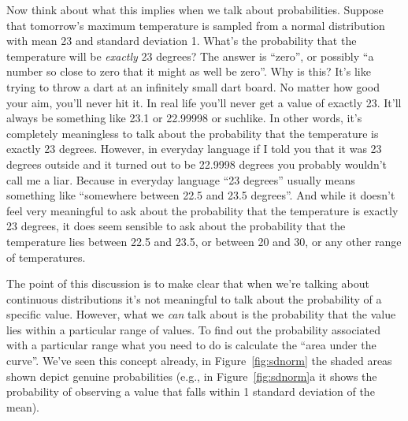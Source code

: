Now think about what this implies when we talk about probabilities. Suppose that tomorrow's maximum temperature is sampled from a normal distribution with mean 23 and standard deviation 1. What's the probability that the temperature will be {\it exactly} 23 degrees? The answer is ``zero'', or possibly ``a number so close to zero that it might as well be zero''. Why is this? It's like trying to throw a dart at an infinitely small dart board. No matter how good your aim, you'll never hit it. In real life you'll never get a value of exactly 23. It'll always be something like 23.1 or 22.99998 or suchlike. In other words, it's completely meaningless to talk about the probability that the temperature is exactly 23 degrees. However, in everyday language if I told you that it was 23 degrees outside and it turned out to be 22.9998 degrees you probably wouldn't call me a liar. Because in everyday language ``23 degrees'' usually means something like ``somewhere between 22.5 and 23.5 degrees''. And while it doesn't feel very meaningful to ask about the probability that the temperature is exactly 23 degrees, it does seem sensible to ask about the probability that the temperature lies between 22.5 and 23.5, or between 20 and 30, or any other range of temperatures. 

The point of this discussion is to make clear that when we're talking about continuous distributions it's not meaningful to talk about the probability of a specific value. However, what we {\it can} talk about is the probability that the value lies within a particular range of values. To find out the probability associated with a particular range what you need to do is calculate the ``area under the curve''. We've seen this concept already, in Figure~\ref{fig:sdnorm} the shaded areas shown depict genuine probabilities (e.g., in Figure~\ref{fig:sdnorm}a it shows the probability of observing a value that falls within 1 standard deviation of the mean). 

